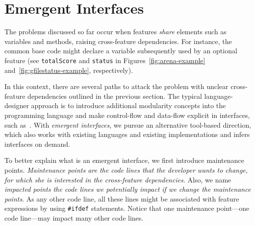 
\section{Emergent Interfaces}

\label{sec:emergent}


The problems discussed so far occur when features \textit{share} elements such as variables and methods, raising cross-feature dependencies. For instance, the common base code might declare a variable subsequently used by an optional feature (see \texttt{totalScore} and \texttt{status} in Figures~\ref{fig:arena-example} and~\ref{fig:gfilestatus-example}, respectively).

In this context, there are several paths to attack the problem with unclear cross-feature dependencies outlined in the previous section. The typical language-designer approach is to introduce additional modularity concepts into the programming language and make control-flow and data-flow explicit in interfaces, such as~\cite{shriram}. With \emph{emergent interfaces}, we pursue an alternative tool-based direction, which also works with existing languages and existing implementations and infers interfaces on demand.


To better explain what is an emergent interface, we first introduce maintenance points. \textit{Maintenance points are the code lines that the developer wants to change, for which she is interested in the cross-feature dependencies.} Also, we name \textit{impacted points the code lines we potentially impact if we change the maintenance points}. As any other code line, all these lines might be associated with feature expressions by using \texttt{\#ifdef} statements. Notice that one maintenance point---one code line---may impact many other code lines.

